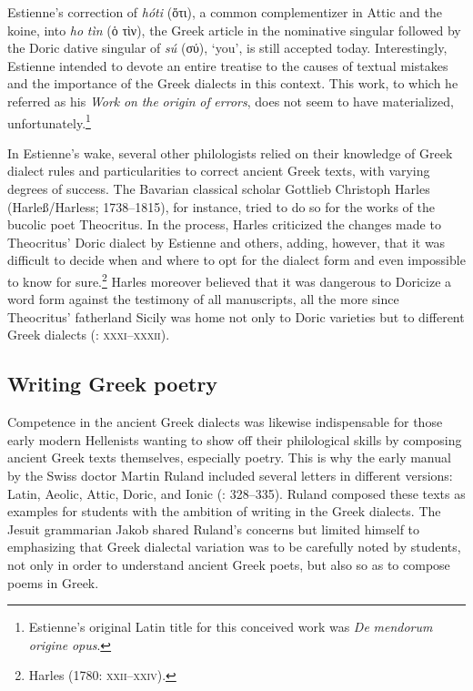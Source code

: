 Estienne’s correction of \textit{hóti} (ὅτι), a common complementizer in Attic and the koine, into \textit{ho} \textit{tìn} (ὁ τὶν), the Greek article in the nominative singular followed by the Doric dative singular of \textit{sú} (σύ), ‘you’, is still accepted today. Interestingly, Estienne intended to devote an entire treatise to the causes of textual mistakes and the importance of the Greek dialects in this context. This work, to which he referred as his \textit{Work} \textit{on} \textit{the} \textit{origin} \textit{of} \textit{errors}, does not seem to have materialized, unfortunately.\footnote{Estienne’s original Latin title for this conceived work was \textit{De} \textit{mendorum} \textit{origine} \textit{opus}.}

In Estienne’s wake, several other philologists relied on their knowledge of Greek dialect rules and particularities to correct ancient Greek texts, with varying degrees of success. The Bavarian classical scholar Gottlieb Christoph Harles (Harleß/Harless; 1738–1815), for instance, tried to do so for the works of the bucolic poet Theocritus. In the process, Harles criticized the changes made to Theocritus’ Doric dialect by Estienne and others, adding, however, that it was difficult to decide when and where to opt for the dialect form and even impossible to know for sure.\footnote{Harles (1780: \textsc{xxii–xxiv}).} Harles moreover believed that it was dangerous to Doricize a word form against the testimony of all manuscripts, all the more since Theocritus’ fatherland Sicily was home not only to Doric varieties but to different Greek dialects (\citealt{Harles1780}: \textsc{xxxi–xxxii}).

\subsection{Writing Greek poetry}

Competence in the ancient Greek dialects was likewise indispensable for those early modern Hellenists wanting to show off their philological skills by composing ancient Greek texts themselves, especially poetry. This is why the early manual by the Swiss doctor Martin Ruland included several letters in different versions: Latin, Aeolic, Attic, Doric, and Ionic (\citealt{Ruland1556}: 328–335). Ruland composed these texts as examples for students with the ambition of writing in the Greek dialects. The Jesuit grammarian Jakob \citet[35]{Gretser1593} shared Ruland’s concerns but limited himself to emphasizing that Greek dialectal variation was to be carefully noted by students, not only in order to understand ancient Greek poets, but also so as to compose poems in Greek.

